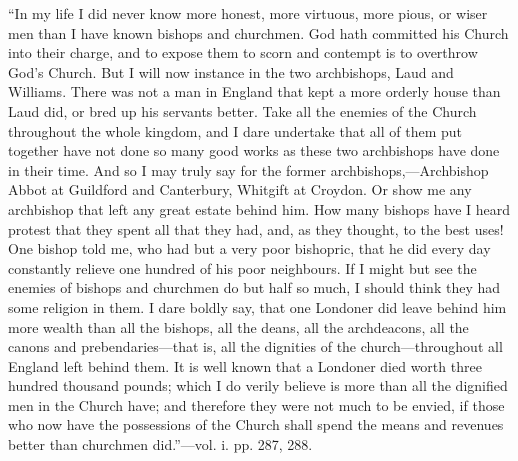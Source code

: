 ``In my life I did never know more
honest, more virtuous, more pious, or wiser men than I have known
bishops and churchmen. God hath committed his Church into their charge,
and to expose them to scorn and contempt is
to overthrow God's Church. But I will now instance in the two
archbishops, Laud and Williams. There was not a man in England that kept
a more orderly house than Laud did, or bred up his servants better. Take
all the enemies of the Church throughout the whole kingdom, and I dare
undertake that all of them put together have not done so many good works
as these two archbishops have done in their time. And so I may truly say
for the former archbishops,—Archbishop Abbot at Guildford and
Canterbury, Whitgift at Croydon. Or show me any archbishop that left any
great estate behind him. How many bishops have I heard protest that they
spent all that they had, and, as they thought, to the best uses! One
bishop told me, who had but a very poor bishopric, that he did every day
constantly relieve one hundred of his poor neighbours. If I might but
see the enemies of bishops and churchmen do but half so much, I should
think they had some religion in them. I dare boldly say, that one
Londoner did leave behind him more wealth than all the bishops, all the
deans, all the archdeacons, all the canons and prebendaries—that is,
all the dignities of the church—throughout all England left behind
them. It is well known that a Londoner died worth three hundred thousand
pounds; which I do verily believe is more than all the dignified men in
the Church have; and therefore they were not much to be envied, if those
who now have the possessions of the Church shall spend the means and
revenues better than churchmen did.''—vol. i. pp. 287, 288.

